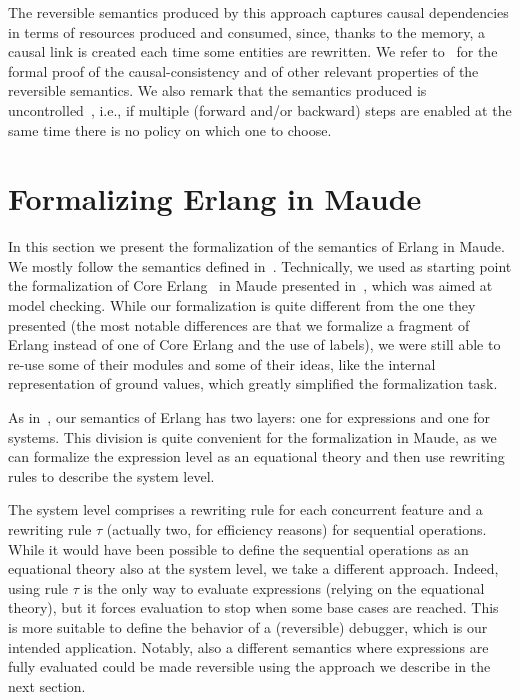 \documentclass{article}[12pt,a4paper]
\theoremstyle{definition}
\begin{document}
The reversible semantics produced by this approach captures causal dependencies
in terms of resources produced and consumed, since, thanks to the memory, a
causal link is created each time some entities are rewritten. We refer
to~\cite{LaneseM20} for the formal proof of the causal-consistency and of other relevant properties of
the reversible semantics. We also remark
that the semantics produced is uncontrolled~\cite{LaneseMS12}, i.e., if multiple (forward and/or backward) steps are enabled at the same time there is no policy on which one to choose.

\section{Formalizing Erlang in Maude}\label{sec:formalizing-erlang}
In this section we present the formalization of the semantics of
Erlang in Maude. We mostly follow the semantics defined
in~\cite{Gonzalez-AbrilV21}. Technically, we used as starting point
the formalization of Core Erlang~\cite{Car01} in Maude presented
in~\cite{NeuhauberN07}, which was aimed at model checking.  While our
formalization is quite different from the one they presented (the most
notable differences are that we formalize a fragment of Erlang instead
of one of Core Erlang and the use of labels), we were still able to
re-use some of their modules and some of their ideas, like the
internal representation of ground values, which greatly simplified the
formalization task.

As in~\cite{Gonzalez-AbrilV21}, our semantics of Erlang has two
layers: one for expressions and one for systems. This division is
quite convenient for the formalization in Maude, as we can formalize
the expression level as an equational theory and then use rewriting
rules to describe the system level.

The system level comprises a rewriting rule for each concurrent
feature and a rewriting rule $\tau$ (actually two, for efficiency
reasons) for sequential operations. While it would have been possible
to define the sequential operations as an equational theory also at
the system level, we take a different approach. Indeed, using rule
$\tau$ is the only way to evaluate expressions (relying on the
equational theory), but it forces evaluation to stop when some base
cases are reached. This is more suitable to define the behavior of a
(reversible) debugger, which is our intended application. Notably,
also a different semantics where expressions are fully evaluated could
be made reversible using the approach we describe in the next section.
\end{document}
